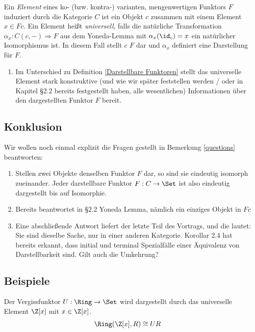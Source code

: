\documentclass[11pt]{article}
\begin{document}
\begin{definition} 
    Ein \emph{Element} eines ko- (bzw. kontra-) varianten, mengenwertigen Funktors $F$ induziert durch die Kategorie $C$ ist ein Objekt $c$ zusammen mit einem Element $x\in Fc$. Ein Element heißt \emph{universell}, falls die natürliche Transformation $\alpha_x : C(c,-)\Longrightarrow F$ aus dem Yoneda-Lemma mit $\alpha_x(\id_c) = x$ ein natürlicher Isomorphismus ist. In diesem Fall stellt $c$ $F$ dar und $\alpha_x$ definiert eine Darstellung für $F$.
\end{definition}

\begin{note}
    \mbox{}
    \begin{enumerate}[label=-]
        \item Im Unterschied zu Definition \ref{Darstellbare Funktoren} stellt das universelle Element stark konstruktive (und wie wir später feststellen werden / oder in Kapitel §2.2 bereits festgestellt haben, alle wesentlichen) Informationen über den dargestellten Funktor $F$ bereit.
    \end{enumerate}
\end{note}
\subsection{Konklusion}
Wir wollen noch einmal explizit die Fragen gestellt in Bemerkung \ref{questions} beantworten:
\begin{note}\label{answers}\mbox{}
\begin{enumerate}[label = zu \arabic*.:]
    \item Stellen zwei Objekte denselben Funktor $F$ dar, so sind sie eindeutig isomorph zueinander. Jeder darstellbare Funktor $F:C\to \Set$ ist also eindeutig dargestellt bis auf Isomorphie.
    \item Bereits beantwortet in §2.2 Yoneda Lemma, nämlich ein einziges Objekt in $Fc$
    \item Eine abschließende Antwort liefert der letzte Teil des Vortrags, und die lautet: Sie sind dieselbe Sache, nur in einer anderen Kategorie. Korollar 2.4 hat bereits erkannt, dass initial und terminal Spezialfälle einer Äquivalenz von Darstellbarkeit sind. Gilt auch die Umkehrung? 
\end{enumerate}
\end{note}

\newpage
\subsection{Beispiele}
\begin{example} 
    Der Vergissfunktor $U: \Ring \to \Set$ wird dargestellt durch das universelle Element $\Z[x]$ mit $x\in \Z[x]$. $$\Ring(\Z[x], R) \cong UR$$
\end{example}
\end{document}
